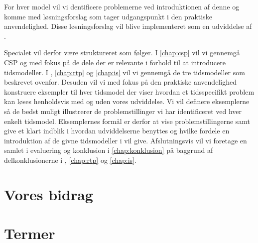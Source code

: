 For hver model vil vi dentificere problemerne ved introduktionen af denne og komme med løsningsforslag som tager udgangspunkt i den praktiske anvendelighed. Disse løsningsforslag vil blive implementeret som en udviddelse af \pycsp. 

Specialet vil derfor være struktureret som følger. I \autoref{chap:csp} vil vi gennemgå CSP og \pycsp med fokus på de dele der er relevante i forhold til at introducere tidsmodeller. I , \ref{chap:rtp} og \ref{chap:is} vil vi gennemgå de tre tidsmodeller som beskrevet ovenfor. Desuden vil vi med fokus på den praktiske anvendelighed konstruere eksempler til hver tidsmodel der viser hvordan et tidsspecifikt problem kan løses henholdsvis med og uden vores udviddelse. Vi vil definere eksemplerne så de bedst muligt illustrerer de problemstillinger vi har identificeret ved hver enkelt tidsmodel. Eksemplernes formål er derfor at vise problemstillingerne samt give et klart indblik i hvordan udviddelserne benyttes og hvilke fordele en introduktion af de givne tidsmodeller i \pycsp vil give. Afslutningsvis vil vi foretage en samlet i evaluering og konklusion i \autoref{chap:konklusion} på baggrund af delkonklusionerne i , \ref{chap:rtp} og \ref{chap:is}.



\section{Vores bidrag}
\section{Termer}

